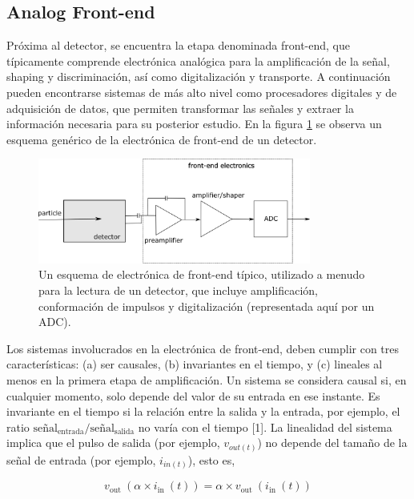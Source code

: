 \documentclass[]{book}
\begin{document}
\subsection{Analog Front-end}

\noindent Próxima al detector, se encuentra la etapa denominada front-end, que típicamente comprende electrónica analógica para la amplificación de la señal, shaping y discriminación, así como digitalización y transporte. A continuación pueden encontrarse sistemas de más alto nivel como procesadores digitales y de adquisición de datos, que permiten transformar las señales y extraer la información necesaria para su posterior estudio. En la figura \ref{fig:generic_frontend} se observa un esquema genérico de la electrónica de front-end de un detector.\\

\begin{figure}[h]
    \centering
    \includegraphics[width=0.8\textwidth]{front-end.png}
    \caption{Un esquema de electrónica de front-end típico, utilizado a menudo para la lectura de un
    detector, que incluye amplificación, conformación de impulsos y digitalización (representada aquí por un ADC).}
    \label{fig:generic_frontend}

\end{figure}

\noindent Los sistemas involucrados en la electrónica de front-end, deben cumplir con tres características: (a) ser causales, (b) invariantes en el tiempo, y (c) lineales al menos en la primera etapa de amplificación. Un sistema se considera causal si, en cualquier momento, solo depende del valor de su entrada en ese instante. Es invariante en el tiempo si la relación entre la salida y la entrada, por ejemplo, el ratio $\text{señal}_{\text{entrada}}/\text{señal}_{\text{salida}}$ no varía con el tiempo [1]. La linealidad del sistema implica que el pulso de salida (por ejemplo, $v_{out(t)}$) no depende del tamaño de la señal de entrada (por ejemplo, $i_{in(t)}$), esto es, 

$$
v_{\text {out }}\left(\alpha \times i_{\text {in }}(t)\right)=\alpha \times v_{\text {out }}\left(i_{\text {in }}(t)\right)
$$
\end{document}
